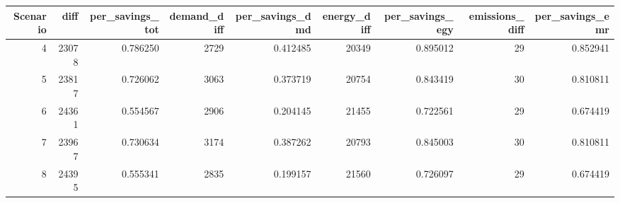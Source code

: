 \begin{tabular}{rrrrrrrrr}
\toprule
 Scenario &  diff &  per\_savings\_tot &  demand\_diff &  per\_savings\_dmd &  energy\_diff &  per\_savings\_egy &  emissions\_diff &  per\_savings\_emr \\
\midrule
        4 & 23078 &         0.786250 &         2729 &         0.412485 &        20349 &         0.895012 &              29 &         0.852941 \\
        5 & 23817 &         0.726062 &         3063 &         0.373719 &        20754 &         0.843419 &              30 &         0.810811 \\
        6 & 24361 &         0.554567 &         2906 &         0.204145 &        21455 &         0.722561 &              29 &         0.674419 \\
        7 & 23967 &         0.730634 &         3174 &         0.387262 &        20793 &         0.845003 &              30 &         0.810811 \\
        8 & 24395 &         0.555341 &         2835 &         0.199157 &        21560 &         0.726097 &              29 &         0.674419 \\
\bottomrule
\end{tabular}
